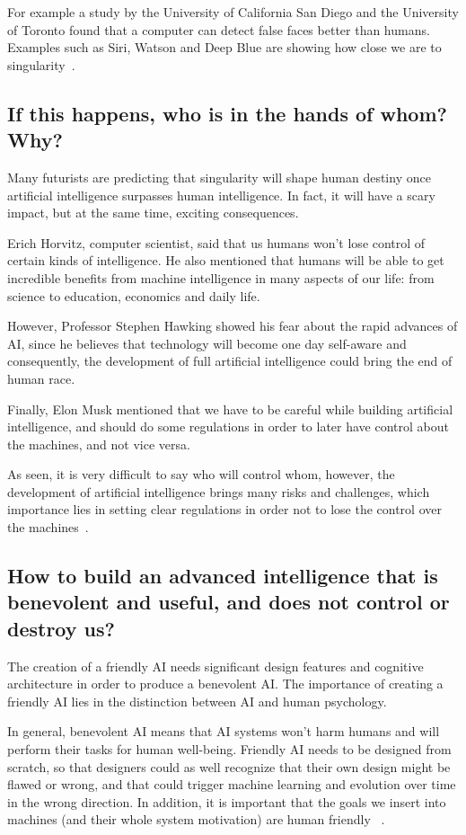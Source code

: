 \documentclass[titlepage, letterpaper, fleqn]{article}
\begin{document}
For example a study by the University of California San Diego and the University of Toronto found that a computer can detect false faces better than humans.
Examples such as Siri, Watson and Deep Blue are showing how close we are to singularity~\cite{Carter15,Utopia13}.

\subsection{If this happens, who is in the hands of whom? Why?}

Many futurists are predicting that singularity will shape human destiny once artificial intelligence surpasses human intelligence.
In fact, it will have a scary impact, but at the same time, exciting consequences.

Erich Horvitz, computer scientist, said that us humans won't lose control of certain kinds of intelligence.
He also mentioned that humans will be able to get incredible benefits from machine intelligence in many aspects of our life: from science to education, economics and daily life.

However, Professor Stephen Hawking showed his fear about the rapid advances of AI, since he believes that technology will become one day self-aware and consequently, the development of full artificial intelligence could bring the end of human race.

Finally, Elon Musk mentioned that we have to be careful while building artificial intelligence, and should do some regulations in order to later have control about the machines, and not vice versa.

As seen, it is very difficult to say who will control whom, however, the development of artificial intelligence brings many risks and challenges, which importance lies in setting clear regulations in order not to lose the control over the machines~\cite{Bostron98,Bostron03}.

\subsection{How to build an advanced intelligence that is benevolent and useful, and does not control or destroy us?}

The creation of a friendly AI needs significant design features and cognitive architecture in order to produce a benevolent AI.
The importance of creating a friendly AI lies in the distinction between AI and human psychology.

In general, benevolent AI means that AI systems won't harm humans and will perform their tasks for human well-being.
Friendly AI needs to be designed from scratch, so that designers could as well recognize that their own design might be flawed or wrong, and that could trigger machine learning and evolution over time in the wrong direction.
In addition, it is important that the goals we insert into machines (and their whole system motivation) are human friendly~\cite{Yudkowsky01}
. 
\cite{}
\end{document}
